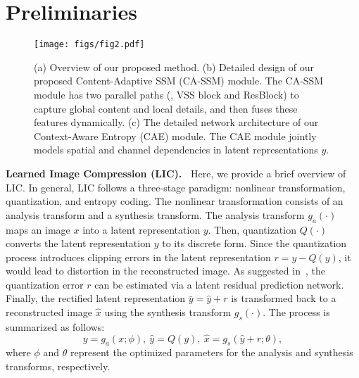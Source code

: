 \section{Preliminaries}

\begin{figure*}[t]
  \centering
   \texttt{[image: figs/fig2.pdf]}
   \caption{
   (a) 
   Overview of our proposed method. 
   (b) 
   Detailed design of our proposed Content-Adaptive SSM (CA-SSM) module.
   The CA-SSM module has two parallel paths (\ie, VSS block and ResBlock) to capture global content and local details, and then fuses these features dynamically.
   (c) 
   The detailed network architecture of our Context-Aware Entropy (CAE) module.
   The CAE module jointly models spatial and channel dependencies in latent representations $y$.
    }
    \vspace{-1em}
   \label{fig2}
\end{figure*}


\noindent \textbf{Learned Image Compression (LIC).~} 
Here, we provide a brief overview of LIC.
In general, LIC follows a three-stage paradigm: nonlinear transformation, quantization, and entropy coding.
The nonlinear transformation consists of an analysis transform and a synthesis transform.
The analysis transform $g_a(\cdot)$ maps an image $x$ into a latent representation $y$.
Then, quantization $Q(\cdot)$ converts the latent representation $y$ to its discrete form.
Since the quantization process introduces clipping errors in the latent representation $r = y - Q(y)$, it would lead to distortion in the reconstructed image. 
As suggested in~\cite{minnen2020channel}, the quantization error $r$ can be estimated via a latent residual prediction network.
Finally, the rectified latent representation $\bar{y}=\hat{y} + r$ is transformed back to a reconstructed image $\hat{x}$ using the synthesis transform $g_s(\cdot)$.
The process is summarized as follows:
\begin{equation}
y = g_a(x; \phi),\
\hat{y} = Q(y),\
\hat{x} = g_s(\hat{y}+r; \theta), 
\label{eq1}
\end{equation}
where $\phi$ and $\theta$ represent the optimized parameters for the analysis and synthesis transforms, respectively.


